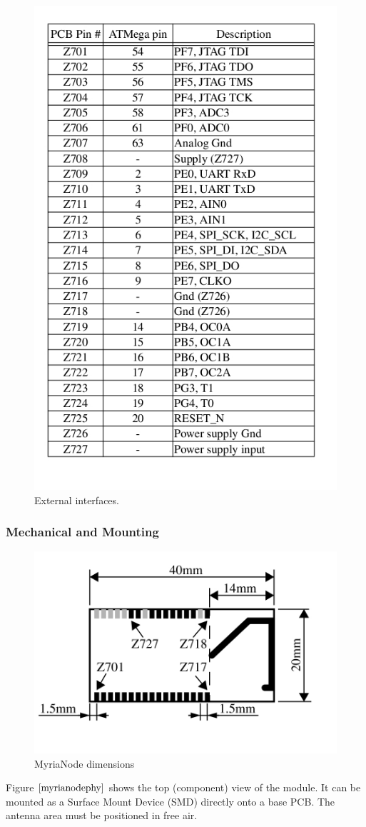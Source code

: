 \documentclass[a4paper,10pt]{report}
\begin{document}
\paragraph*{}
\begin{figure}[!h]
 \centering
 \includegraphics[width = 0.7 \textwidth] {table2}
 \caption{External interfaces.}
 \label{table2}
\end{figure}
\subsubsection{Mechanical and Mounting}
\begin{figure}[!h]
 \centering
 \includegraphics[width= 0.7 \textwidth]{myrianodephy}
 \caption{MyriaNode dimensions}
 \label{myrianodephy}
\end{figure}
Figure $\ref{myrianodephy}$ shows the top (component) view of the module. It can be mounted as a Surface Mount Device (SMD) directly onto a base PCB. The antenna area must be positioned in free air.
\end{document}
